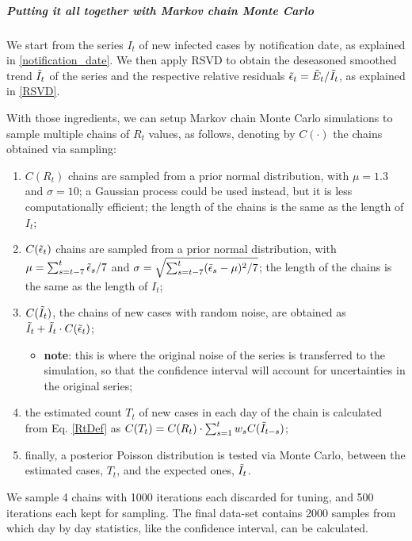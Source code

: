 \documentclass[graybox]{svmult}
\begin{document}
\subparagraph{Putting it all together with Markov chain Monte Carlo}

We start from the series $I_t$ of new infected cases by notification date, as explained in \ref{notification_date}. We then apply RSVD to obtain the deseasoned smoothed trend $\Tilde{I}_t$ of the series and the respective relative residuals $\Tilde{\epsilon}_t = \Tilde{E}_t/\Tilde{I}_t$, as explained in \ref{RSVD}. 

With those ingredients, we can setup Markov chain Monte Carlo simulations to sample multiple chains of $R_t$ values, as follows, denoting by $C(\cdot)$ the chains obtained via sampling:
\begin{enumerate}
    \item $C(R_t)$ chains are sampled from a prior normal distribution, with $\mu=1.3$ and $\sigma=10$; a Gaussian process could be used instead, but it is less computationally efficient; the length of the chains is the same as the length of $I_t$;
    \item $C(\Tilde{\epsilon}_t)$ chains are sampled from a prior normal distribution, with $\mu=\sum_{s=t-7}^t{\Tilde{\epsilon}_s}/7$ and $\sigma=\sqrt{\sum_{s=t-7}^{t}(\Tilde{\epsilon}_s-\mu)^2/7}$; the length of the chains is the same as the length of $I_t$;
    \item $C(\Tilde{I}_t)$, the chains of new cases with random noise, are obtained as $\Tilde{I}_t+\Tilde{I}_t \cdot C(\Tilde{\epsilon}_t)$;
    \begin{itemize}
        \item \textbf{note}: this is where the original noise of the series is transferred to the simulation, so that the confidence interval will account for uncertainties in the original series;
    \end{itemize}
    \item the estimated count $T_t$ of new cases in each day of the chain is calculated from Eq. \ref{RtDef} as $C(T_t) = C(R_t) \cdot \sum_{s=1}^t w_s C(\Tilde{I}_{t-s})$;
    \item finally, a posterior Poisson distribution is tested via Monte Carlo, between the estimated cases, $T_t$, and the expected ones, $\Tilde{I}_t$.
\end{enumerate}

We sample 4 chains with 1000 iterations each discarded for tuning, and 500 iterations each kept for sampling. The final data-set contains 2000 samples from which day by day statistics, like the confidence interval, can be calculated.
\end{document}

